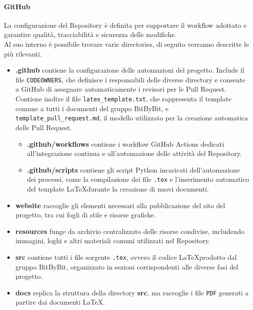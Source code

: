 \documentclass[a4paper,12pt]{article}
\begin{document}
\paragraph{GitHub} 
La configurazione del Repository è definita per supportare il workflow adottato e garantire qualità, tracciabilità e sicurezza delle modifiche.\\
Al suo interno è possibile trovare varie directories, di seguito verranno descritte le più rilevanti.
\begin{itemize}
    \item \textbf{.github} contiene la configurazione delle automazioni del progetto. Include il file \texttt{CODEOWNERS}, che definisce i responsabili delle diverse directory e consente a GitHub di assegnare automaticamente i revisori per le Pull Request. Contiene inoltre il file \texttt{latex\_template.txt}, che rappresenta il template comune a tutti i documenti del gruppo BitByBit, e \texttt{template\_pull\_request.md}, il modello utilizzato per la creazione automatica delle Pull Request.
    \begin{itemize}
        \item \textbf{.github/workflows} contiene i workflow GitHub Actions dedicati all’integrazione continua e all’automazione delle attività del Repository.
        \item \textbf{.github/scripts} contiene gli script Python incaricati dell’automazione dei processi, come la compilazione dei file \texttt{.tex} e l’inserimento automatico del template \LaTeX durante la creazione di nuovi documenti.
    \end{itemize}
    \item \textbf{website} raccoglie gli elementi necessari alla pubblicazione del sito del progetto, tra cui fogli di stile e risorse grafiche.
    \item \textbf{resources} funge da archivio centralizzato delle risorse condivise, includendo immagini, loghi e altri materiali comuni utilizzati nel Repository.
    \item \textbf{src} contiene tutti i file sorgente \texttt{.tex}, ovvero il codice \LaTeX prodotto dal gruppo BitByBit, organizzato in sezioni corrispondenti alle diverse fasi del progetto.
    \item \textbf{docs} replica la struttura della directory \textbf{src}, ma raccoglie i file \texttt{PDF} generati a partire dai documenti \LaTeX.
\end{itemize}

\end{document}
